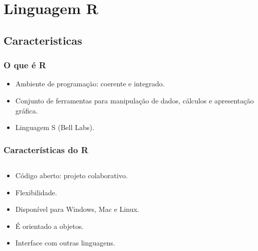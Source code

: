 \documentclass[handout]{beamer}
\begin{document}
 \section{Linguagem  R}
\subsection{Caracteristicas}

 \begin{frame}
    \frametitle{O que é R}
   \begin{center}

   \begin{itemize}
   \item Ambiente de programação: coerente e integrado. 
   \item Conjunto de ferramentas para manipulação de dados, cálculos e apresentação gráfica.
   \item Linguagem S (Bell Labs).
   \end{itemize}
 \end{center}
 \end{frame}

 \begin{frame}
  \frametitle{Características do R }
  \begin{columns}
    \begin{column}{6cm}
      \begin{center}
        \begin{itemize}
        \item Código aberto: projeto colaborativo.
        \item Flexibilidade.
        \item Disponível para Windows, Mac e Linux.
        \item É orientado a objetos.
        \item Interface com outras linguagens.
        \end{itemize}
      \end{center}
    \end{column}
    \begin{column}{6cm}
    \end{column}
  \end{columns}

 \end{frame}
\end{document}

